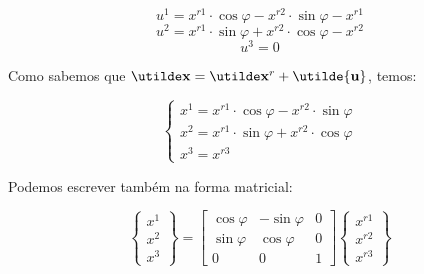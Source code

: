 \begin{enumerate}[a)]
		\[u^1=x^{r1}\cdot\cos\varphi-x^{r2}\cdot\sin\varphi-x^{r1}\]
		\[u^2=x^{r1}\cdot\sin\varphi+x^{r2}\cdot\cos\varphi-x^{r2}\]
		\[u^3=0\]
			
		Como sabemos que $\vt{x}=\vt{x}^r+\utilde{\mathbf{u}}$, temos:
			
		\[
			\begin{cases}
				x^1=x^{r1}\cdot\cos\varphi-x^{r2}\cdot\sin\varphi \\ x^2=x^{r1}\cdot\sin\varphi+x^{r2}\cdot\cos\varphi \\ x^3=x^{r3}
			\end{cases}
		\]
			
		Podemos escrever também na forma matricial:
			
		\[
			\begin{Bmatrix}
				x^1 \\ x^2 \\ x^3
			\end{Bmatrix}
			=
			\begin{bmatrix}	
				\cos\varphi & -\sin\varphi & 0 \\
				\sin\varphi & \cos\varphi & 0 \\
				0 & 0 & 1
			\end{bmatrix}
			\begin{Bmatrix}
				x^{r1} \\ x^{r2} \\ x^{r3}
			\end{Bmatrix}							
		\]
\end{enumerate}